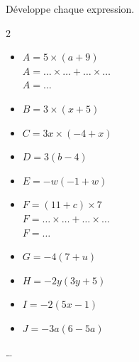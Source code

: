 \begin{exercice*}
    Développe chaque expression.
    \begin{multicols}{2}
        \begin{itemize}
            \item[] $A = 5 \times (a + 9)$ \\
                  $A = \dots \times \dots + \dots \times \dots$ \\
                  $A = \dots$

            \item[] $B = 3 \times (x + 5)$

            \item[] $C = 3x \times (-4 + x)$

            \item[] $D = 3(b - 4)$

            \item[] $E = -w(-1 + w)$

            \item[] $F = (11 + c) \times 7$ \\
                  $F = \dots \times \dots + \dots \times \dots$ \\
                  $F = \dots$

            \item[] $G = -4(7 + u)$

            \item[] $H = -2y(3y + 5)$

            \item[] $I = -2(5x - 1)$

            \item[] $J = -3a(6 - 5a)$
        \end{itemize}
    \end{multicols}
\end{exercice*}
\begin{corrige}
    \dots
\end{corrige}

